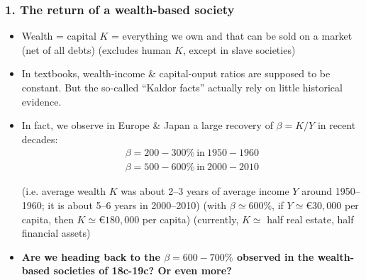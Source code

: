 \documentclass[t]{beamer}\usepackage[]{graphicx}\usepackage[]{color}
\begin{document}
\begin{frame}[label=WealthReturn,shrink=8]
\frametitle{1. The return of a wealth-based society}
\begin{itemize}
\item
Wealth = capital $K$ = everything we own and that can be sold on a market (net of all debts) (excludes human $K$, except in slave societies)
\item
In textbooks, wealth-income \& capital-ouput ratios are supposed to be constant. But the so-called ``Kaldor facts'' actually rely on little historical evidence.
\item
In fact, we observe in Europe \& Japan a large recovery of $\beta=K/Y$ in recent decades:
\begin{align*}
\beta = 200-300\% ~\text{in}~ 1950-1960 \\
\beta = 500-600\% ~\text{in}~ 2000-2010
\end{align*}
\begin{footnotesize}
(i.e. average wealth $K$ was about 2--3 years of average income $Y$ around 1950--1960; it is about 5--6 years in 2000--2010)
\linebreak
(with $\beta \simeq 600\%$, if $Y \simeq \euro 30,000$ per capita, then $K \simeq \euro 180,000$ per capita) (currently, $K \simeq$ half real estate, half financial assets)
\end{footnotesize}
\item
\textbf{Are we heading back to the $\beta = 600-700\%$ observed in the wealth-based societies of 18c-19c? Or even more?}
\end{itemize}
\end{frame}






\end{document}
